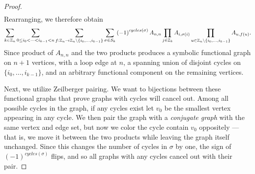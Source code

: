 \begin{proof}
\begin{align*}
    \end{align*}
    Rearranging, we therefore obtain
    \begin{align*}
        \sum_{k\in\mathbb{Z}_n}\sum_{0 \leq i_0 < \cdots < i_{k-1}<n}\sum_{f:\mathbb{Z}_n\to\mathbb{Z}_{n}\setminus\{i_0, \ldots, i_{k-1}\}}\sum_{\sigma\in S_k}\left(-1\right)^{cycles(\sigma)}A_{n,n}\prod_{j\in\mathbb{Z}_k}A_{i,\sigma(i)}\prod_{u\in\mathbb{Z}_n\setminus\{i_0, \ldots, i_{k-1}\}}A_{u,f(u)}.
    \end{align*}
    Since product of $A_{n,n}$ and the two products produces a symbolic functional graph on $n+1$ vertices, with a loop edge at $n$, a spanning union of disjoint cycles on $\{i_0, \ldots, i_{k-1}\}$, and an arbitrary functional component on the remaining vertices.

    Next, we utilize Zeilberger pairing. We want to bijections between these functional graphs that prove graphs with cycles will cancel out. Among all possible cycles in the graph, if any cycles exist let $v_0$ be the smallest vertex appearing in any cycle. We then pair the graph with a \emph{conjugate graph} with the same vertex and edge set, but now we color the cycle contain $v_0$ oppositely --- that is, we move it between the two products while leaving the graph itself unchanged. Since this changes the number of cycles in $\sigma$ by one, the sign of $(-1)^{cycles(\sigma)}$ flips, and so all graphs with any cycles cancel out with their pair.
\end{proof}
